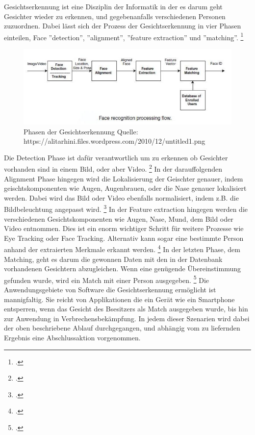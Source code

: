 \documentclass[12pt, a4paper]{scrbook}
\begin{document}
Gesichtserkennung ist eine Disziplin der Informatik in der es darum geht Gesichter wieder zu erkennen, und gegebenanfalls verschiedenen Personen zuzuordnen. Dabei lässt sich der Prozess der
Gesichtserkennung in vier Phasen einteilen, Face ''detection'', ''alignment'', ''feature extraction'' und ''matching''.
\footcite[Vgl. ][2]{HandbookFaceRec}
\begin{figure}
\includegraphics[width=\linewidth]{Bilder/FaceRecognition.png}
\caption{ Phasen der Gesichtserkennung \newline Quelle: https://alitarhini.files.wordpress.com/2010/12/untitled1.png }
\label{fig:Face Recognition}
\end{figure}
Die Detection Phase ist dafür verantwortlich um zu erkennen ob Gesichter vorhanden sind in einem Bild, oder aber Video.
\footcite[Vgl. ][2]{HandbookFaceRec}
In der darauffolgenden Alignment Phase hingegen wird die Lokalisierung der Geischter genauer, indem geischtskomponenten wie Augen, Augenbrauen, oder die Nase genauer lokalisiert werden. Dabei
wird das Bild oder Video ebenfalls normalisiert, indem z.B. die Bildbeleuchtung angepasst wird.
 \footcite[Vgl. ][2]{HandbookFaceRec}
In der Feature extraction hingegen werden die verschiedenen Gesichtskomponenten wie Augen, Nase, Mund, dem Bild oder Video entnommen. Dies ist ein enorm wichtiger Schritt für weitere Prozesse wie
Eye Tracking oder Face Tracking. Alternativ kann sogar eine bestimmte Person anhand der extraierten Merkmale erkannt werden.
\footcite[Vgl. ][Abstract]{IEEE}
In der letzten Phase, dem Matching, geht es darum die gewonnen Daten mit den in der Datenbank vorhandenen Gesichtern abzugleichen. Wenn eine genügende Übereinstimmung gefunden wurde, wird ein
Match mit einer Person ausgegeben.
  \footcite[Vgl. ][3]{HandbookFaceRec}
Die Anwendungsgebiete von Software die Gesichtserkennung ermöglicht ist mannigfaltig. Sie reicht von Applikationen die ein Gerät wie ein Smartphone entsperren, wenn das Gesicht des Bsesitzers als
Match ausgegeben wurde, bis hin zur Anwendung in Verbrechensbekämpfung. In jedem dieser Szenarien wird dabei der oben beschriebene Ablauf durchgegangen, und abhängig vom zu liefernden Ergebnis
eine Abschlussaktion vorgenommen.
 
\end{document}
